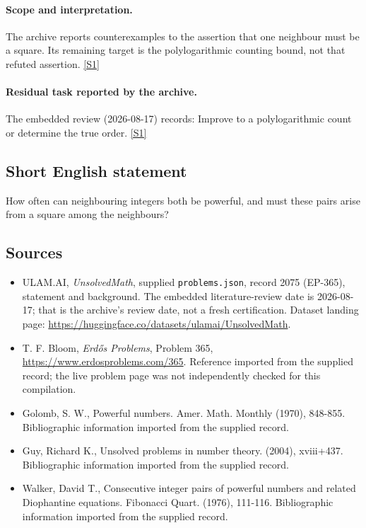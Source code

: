 \documentclass[11pt,a4paper]{article}
\newcommand{\sref}[2]{\hyperlink{source:#1:#2}{[S#2]}}
\begin{document}
\paragraph{Scope and interpretation.}

The archive reports counterexamples to the assertion that one neighbour must be a square. Its remaining target is the polylogarithmic counting bound, not that refuted assertion. \sref{2075}{1}

\paragraph{Residual task reported by the archive.}

The embedded review (2026-08-17) records: Improve to a polylogarithmic count or determine the true order. \sref{2075}{1}

\subsection{Short English statement}

How often can neighbouring integers both be powerful, and must these pairs arise from a square among the neighbours?

\subsection{Sources}

{\small

\begin{itemize}

\item[\hypertarget{source:2075:1}{S1}] ULAM.AI, \emph{UnsolvedMath}, supplied \texttt{problems.json}, record 2075 (EP-365), statement and background. The embedded literature-review date is 2026-08-17; that is the archive’s review date, not a fresh certification. Dataset landing page: \url{https://huggingface.co/datasets/ulamai/UnsolvedMath}.

\item[\hypertarget{source:2075:2}{S2}] T. F. Bloom, \emph{Erdős Problems}, Problem 365, \url{https://www.erdosproblems.com/365}. Reference imported from the supplied record; the live problem page was not independently checked for this compilation.

\item[\hypertarget{source:2075:3}{S3}] Golomb, S. W., Powerful numbers. Amer. Math. Monthly (1970), 848-855. Bibliographic information imported from the supplied record.

\item[\hypertarget{source:2075:4}{S4}] Guy, Richard K., Unsolved problems in number theory. (2004), xviii+437. Bibliographic information imported from the supplied record.

\item[\hypertarget{source:2075:5}{S5}] Walker, David T., Consecutive integer pairs of powerful numbers and related Diophantine equations. Fibonacci Quart. (1976), 111-116. Bibliographic information imported from the supplied record.

\end{itemize}

}

\label{end:2075}
\end{document}

